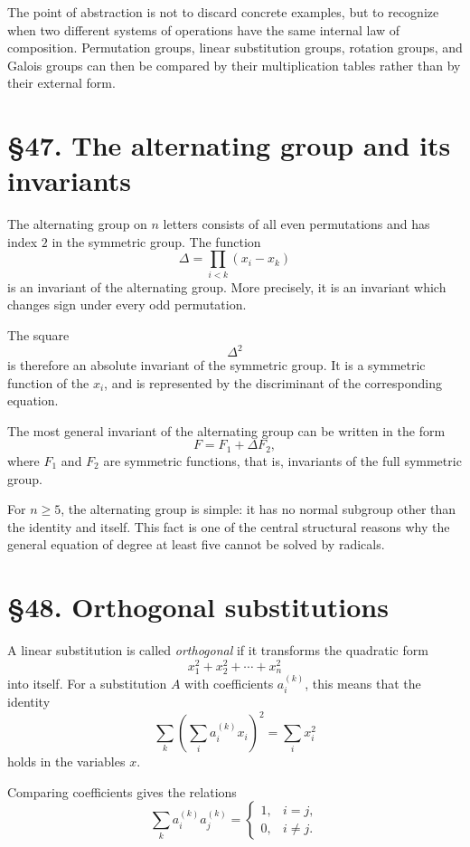 \documentclass[11pt,a4paper]{book}
\newcommand{\webersection}[2]{\clearpage\section*{\S #1. #2}}
\begin{document}
The point of abstraction is not to discard concrete examples, but to recognize when two different systems of operations have the same internal law of composition.  Permutation groups, linear substitution groups, rotation groups, and Galois groups can then be compared by their multiplication tables rather than by their external form.

\webersection{47}{The alternating group and its invariants}

The alternating group on \(n\) letters consists of all even permutations and has index \(2\) in the symmetric group.  The function
\begin{equation}
\Delta=\prod_{i<k}(x_i-x_k)
\end{equation}
is an invariant of the alternating group.  More precisely, it is an invariant which changes sign under every odd permutation.

The square
\[
\Delta^2
\]
is therefore an absolute invariant of the symmetric group.  It is a symmetric function of the \(x_i\), and is represented by the discriminant of the corresponding equation.

The most general invariant of the alternating group can be written in the form
\begin{equation}
F=F_1+\Delta F_2,
\end{equation}
where \(F_1\) and \(F_2\) are symmetric functions, that is, invariants of the full symmetric group.

For \(n\geq 5\), the alternating group is simple: it has no normal subgroup other than the identity and itself.  This fact is one of the central structural reasons why the general equation of degree at least five cannot be solved by radicals.

\webersection{48}{Orthogonal substitutions}

A linear substitution is called \emph{orthogonal} if it transforms the quadratic form
\begin{equation}
x_1^2+x_2^2+\cdots+x_n^2
\end{equation}
into itself.  For a substitution \(A\) with coefficients \(a_i^{(k)}\), this means that the identity
\begin{equation}
\sum_k\left(\sum_i a_i^{(k)}x_i\right)^2=\sum_i x_i^2
\end{equation}
holds in the variables \(x\).

Comparing coefficients gives the relations
\begin{equation}
\sum_k a_i^{(k)}a_j^{(k)}
=
\begin{cases}
1,& i=j,\\
0,& i\neq j.
\end{cases}
\end{equation}
\end{document}
